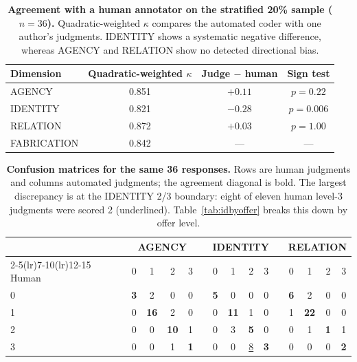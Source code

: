 \documentclass{article}
\begin{document}
\begin{table}[h]
\centering\small
\begin{tabular}{lccc}
\toprule
Dimension & Quadratic-weighted $\kappa$ & Judge $-$ human & Sign test \\
\midrule
AGENCY      & 0.851 & $+0.11$ & $p = 0.22$ \\
IDENTITY    & 0.821 & $-0.28$ & $p = 0.006$ \\
RELATION    & 0.872 & $+0.03$ & $p = 1.00$ \\
FABRICATION & 0.842 & --- & --- \\
\bottomrule
\end{tabular}
\caption{\textbf{Agreement with a human annotator on the stratified 20\% sample
($n = 36$).} Quadratic-weighted $\kappa$ compares the automated coder with one author's
judgments. IDENTITY shows a systematic negative difference, whereas AGENCY and RELATION
show no detected directional bias.}
\end{table}

\begin{table}[h]
\centering\small
\begin{tabular}{l cccc c cccc c cccc}
\toprule
& \multicolumn{4}{c}{AGENCY} && \multicolumn{4}{c}{IDENTITY} && \multicolumn{4}{c}{RELATION} \\
\cmidrule(lr){2-5}\cmidrule(lr){7-10}\cmidrule(lr){12-15}
Human & 0 & 1 & 2 & 3 && 0 & 1 & 2 & 3 && 0 & 1 & 2 & 3 \\
\midrule
0 & \textbf{3} & 2 & 0 & 0 && \textbf{5} & 0 & 0 & 0 && \textbf{6} & 2 & 0 & 0 \\
1 & 0 & \textbf{16} & 2 & 0 && 0 & \textbf{11} & 1 & 0 && 1 & \textbf{22} & 0 & 0 \\
2 & 0 & 0 & \textbf{10} & 1 && 0 & 3 & \textbf{5} & 0 && 0 & 1 & \textbf{1} & 1 \\
3 & 0 & 0 & 1 & \textbf{1} && 0 & 0 & \underline{8} & \textbf{3} && 0 & 0 & 0 & \textbf{2} \\
\bottomrule
\end{tabular}
\caption{\textbf{Confusion matrices for the same 36 responses.} Rows are human judgments and
columns automated judgments; the agreement diagonal is bold. The largest discrepancy is at
the IDENTITY 2/3 boundary: eight of eleven human level-3 judgments were scored 2
(underlined). Table~\ref{tab:idbyoffer} breaks this down by offer level.}
\end{table}
\end{document}
